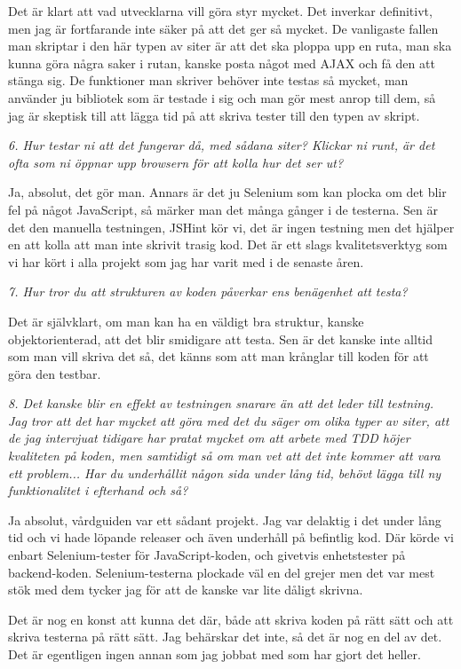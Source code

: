 \documentclass[11pt]{article}
\begin{document}
Det är klart att vad utvecklarna vill göra styr mycket. Det inverkar definitivt, men jag är fortfarande inte säker på att det ger så mycket. De vanligaste fallen man skriptar i den här typen av siter är att det ska ploppa upp en ruta, man ska kunna göra några saker i rutan, kanske posta något med AJAX och få den att stänga sig. De funktioner man skriver behöver inte testas så mycket, man använder ju bibliotek som är testade i sig och man gör mest anrop till dem, så jag är skeptisk till att lägga tid på att skriva tester till den typen av skript.

\emph{6. Hur testar ni att det fungerar då, med sådana siter? Klickar ni runt, är det ofta som ni öppnar upp browsern för att kolla hur det ser ut?}

Ja, absolut, det gör man. Annars är det ju Selenium som kan plocka om det blir fel på något JavaScript, så märker man det många gånger i de testerna. Sen är det den manuella testningen, JSHint kör vi, det är ingen testning men det hjälper en att kolla att man inte skrivit trasig kod. Det är ett slags kvalitetsverktyg som vi har kört i alla projekt som jag har varit med i de senaste åren.

\emph{7. Hur tror du att strukturen av koden påverkar ens benägenhet att testa?}

Det är självklart, om man kan ha en väldigt bra struktur, kanske objektorienterad, att det blir smidigare att testa. Sen är det kanske inte alltid som man vill skriva det så, det känns som att man krånglar till koden för att göra den testbar.

\emph{8. Det kanske blir en effekt av testningen snarare än att det leder till testning. Jag tror att det har mycket att göra med det du säger om olika typer av siter, att de jag intervjuat tidigare har pratat mycket om att arbete med TDD höjer kvaliteten på koden, men samtidigt så om man vet att det inte kommer att vara ett problem... Har du underhållit någon sida under lång tid, behövt lägga till ny funktionalitet i efterhand och så?}

Ja absolut, vårdguiden var ett sådant projekt. Jag var delaktig i det under lång tid och vi hade löpande releaser och även underhåll på befintlig kod. Där körde vi enbart Selenium-tester för JavaScript-koden, och givetvis enhetstester på backend-koden. Selenium-testerna plockade väl en del grejer men det var mest stök med dem tycker jag för att de kanske var lite dåligt skrivna.

Det är nog en konst att kunna det där, både att skriva koden på rätt sätt och att skriva testerna på rätt sätt. Jag behärskar det inte, så det är nog en del av det. Det är egentligen ingen annan som jag jobbat med som har gjort det heller.
\end{document}
